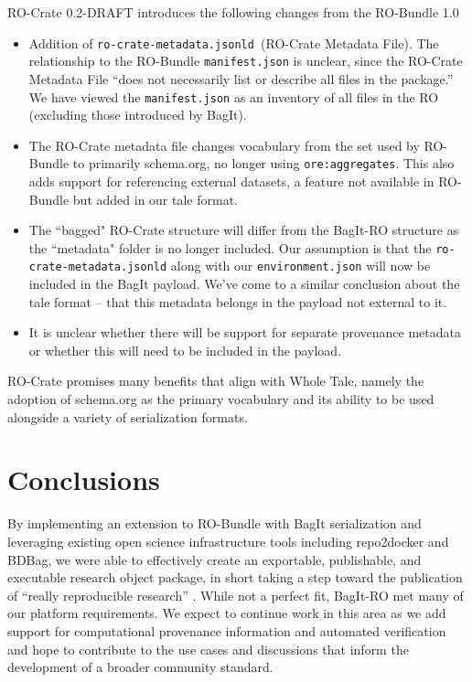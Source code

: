 \documentclass[conference]{IEEEtran}
\begin{document}
RO-Crate 0.2-DRAFT introduces the following changes from the RO-Bundle 1.0
\begin{itemize}
\item{Addition of \texttt{ro-crate-metadata.jsonld }(RO-Crate Metadata File). The relationship to the RO-Bundle \texttt{manifest.json} is unclear, since the RO-Crate Metadata File ``does not necessarily list or describe all files in the package.'' We have viewed the \texttt{manifest.json} as an inventory of all files in the RO (excluding those introduced by BagIt).}
\item{The RO-Crate metadata file changes vocabulary from the set used by RO-Bundle to primarily schema.org, no longer using \texttt{ore:aggregates}. This also adds support for referencing external datasets, a feature not available in RO-Bundle but added in our tale format.}
\item{The ``bagged" RO-Crate structure will differ from the BagIt-RO structure as the ``metadata" folder is no longer included.  Our assumption is that the \texttt{ro-crate-metadata.jsonld} along with our \texttt{environment.json} will now be included in the BagIt payload. We've come to a similar conclusion about the tale format -- that this metadata belongs in the payload not external to it.}
\item{It is unclear whether there will be support for separate provenance metadata or whether this will need to be included in the payload.}
\end{itemize}

RO-Crate promises many benefits that align with Whole Tale, namely the adoption of schema.org as the primary vocabulary and its ability to be used alongside a variety of serialization formats. 


\section{Conclusions} \label{conclusion}
By implementing an extension to RO-Bundle with BagIt serialization and leveraging existing open science infrastructure tools including repo2docker and BDBag, we were able to effectively create an exportable, publishable, and executable research object package, in short taking a step toward the publication of ``really reproducible research'' \cite{claerbout1992}.  While not a perfect fit, BagIt-RO met many of our platform requirements. We expect to continue work in this area as we add support for computational provenance information and automated verification and hope to contribute to the use cases and discussions that inform the development of a broader community standard.
\end{document}
